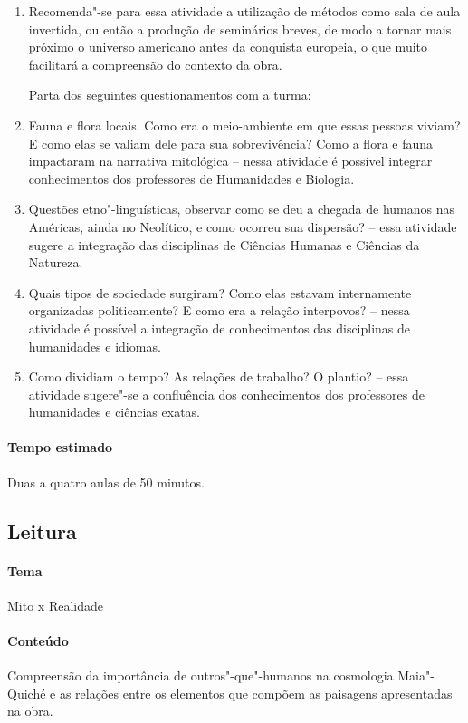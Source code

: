 \documentclass[11pt]{extarticle}
\begin{document}
\begin{enumerate}
\item 
Recomenda"-se para essa atividade a utilização de métodos como sala de
aula invertida, ou então a produção de seminários breves, de modo a
tornar mais próximo o universo americano antes da conquista europeia, o
que muito facilitará a compreensão do contexto da obra.

Parta dos seguintes questionamentos com a turma:

\item
Fauna e flora locais. Como era o meio-ambiente em que essas pessoas
viviam? E como elas se valiam dele para sua sobrevivência? Como a
flora e fauna impactaram na narrativa mitológica -- nessa atividade é
possível integrar conhecimentos dos professores de Humanidades e Biologia.

\item
Questões etno"-linguísticas, observar como se deu a chegada de humanos
nas Américas, ainda no Neolítico, e como ocorreu sua dispersão? --
essa atividade sugere a integração das disciplinas de Ciências Humanas 
e Ciências da Natureza.
\item
Quais tipos de sociedade surgiram? Como elas estavam internamente
organizadas politicamente? E como era a relação interpovos? -- nessa
atividade é possível a integração de conhecimentos das disciplinas de 
humanidades e idiomas.

\item
Como dividiam o tempo? As relações de trabalho? O plantio? -- essa 
atividade sugere"-se a confluência dos conhecimentos dos professores de 
humanidades e ciências exatas.

\end{enumerate}

\paragraph{Tempo estimado} Duas a quatro aulas de 50 minutos. 

\subsection{Leitura} 

\paragraph{Tema} Mito x Realidade

\paragraph{Conteúdo} Compreensão da importância de outros"-que"-humanos na cosmologia
Maia"-Quiché e as relações entre os elementos que compõem as paisagens apresentadas na obra. 
\end{document}
